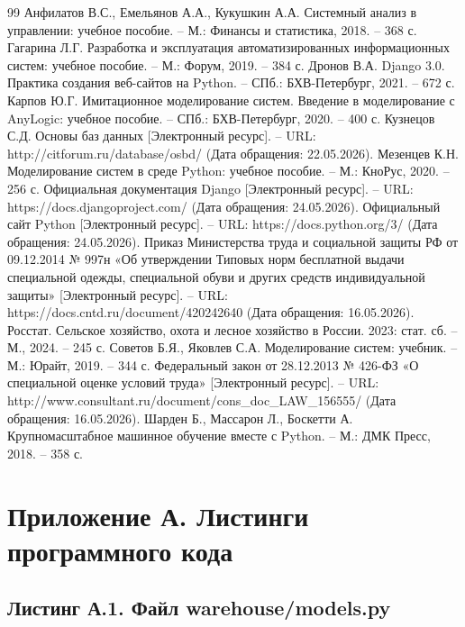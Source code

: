 \documentclass[14pt,a4paper]{extreport}
\begin{document}
\begin{singlespacing}
\begin{thebibliography}{99}
		 Анфилатов В.С., Емельянов А.А., Кукушкин А.А. Системный анализ в управлении: учебное пособие. -- М.: Финансы и статистика, 2018. -- 368 с.
		 Гагарина Л.Г. Разработка и эксплуатация автоматизированных информационных систем: учебное пособие. -- М.: Форум, 2019. -- 384 с.
		 Дронов В.А. Django 3.0. Практика создания веб-сайтов на Python. -- СПб.: БХВ-Петербург, 2021. -- 672 с.
		 Карпов Ю.Г. Имитационное моделирование систем. Введение в моделирование с AnyLogic: учебное пособие. -- СПб.: БХВ-Петербург, 2020. -- 400 с.
		 Кузнецов С.Д. Основы баз данных [Электронный ресурс]. -- URL: http://citforum.ru/database/osbd/ (Дата обращения: 22.05.2026).
		 Мезенцев К.Н. Моделирование систем в среде Python: учебное пособие. -- М.: КноРус, 2020. -- 256 с.
		 Официальная документация Django [Электронный ресурс]. -- URL: https://docs.djangoproject.com/ (Дата обращения: 24.05.2026).
		 Официальный сайт Python [Электронный ресурс]. -- URL: https://docs.python.org/3/ (Дата обращения: 24.05.2026).
		 Приказ Министерства труда и социальной защиты РФ от 09.12.2014 № 997н «Об утверждении Типовых норм бесплатной выдачи специальной одежды, специальной обуви и других средств индивидуальной защиты» [Электронный ресурс]. -- URL: https://docs.cntd.ru/document/420242640 (Дата обращения: 16.05.2026).
		 Росстат. Сельское хозяйство, охота и лесное хозяйство в России. 2023: стат. сб. -- М., 2024. -- 245 с.
		 Советов Б.Я., Яковлев С.А. Моделирование систем: учебник. -- М.: Юрайт, 2019. -- 344 с.
		 Федеральный закон от 28.12.2013 № 426-ФЗ «О специальной оценке условий труда» [Электронный ресурс]. -- URL: http://www.consultant.ru/document/cons\_doc\_LAW\_156555/ (Дата обращения: 16.05.2026).
		 Шарден Б., Массарон Л., Боскетти А. Крупномасштабное машинное обучение вместе с Python. -- М.: ДМК Пресс, 2018. -- 358 с.
	\end{thebibliography}
	\newpage
	
	\applications
	
	\section*{Приложение А. Листинги программного кода}
	
	\subsection*{Листинг А.1. Файл warehouse/models.py}
	

\end{singlespacing}
\end{document}
